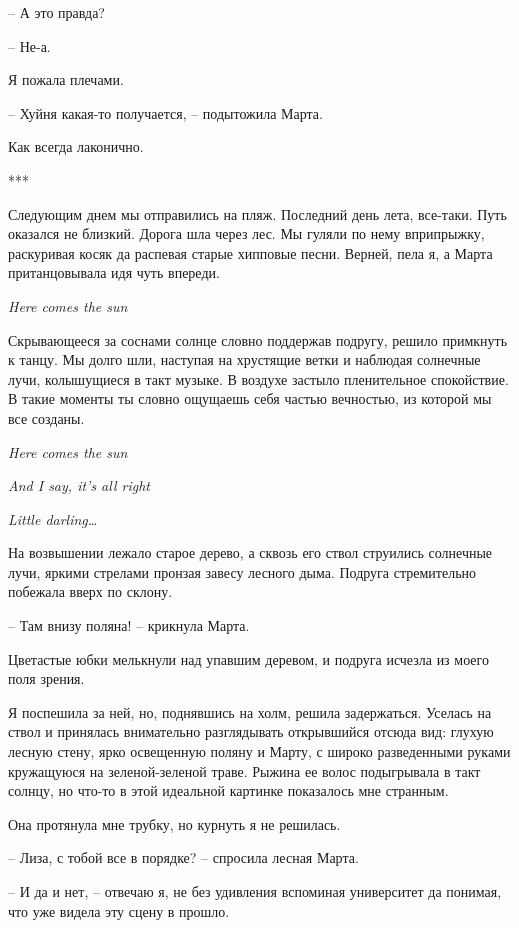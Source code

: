 \documentclass[
]{book}
\begin{document}
-- А это правда?

-- Не-а.

Я пожала плечами.

-- Хуйня какая-то получается, -- подытожила Марта.

Как всегда лаконично.

***

Следующим днем мы отправились на пляж. Последний день лета, все-таки. Путь оказался не близкий. Дорога шла через лес. Мы гуляли по нему вприпрыжку, раскуривая косяк да распевая старые хипповые песни. Верней, пела я, а Марта пританцовывала идя чуть впереди.

\emph{Here comes the sun}

Скрывающееся за соснами солнце словно поддержав подругу, решило примкнуть к танцу. Мы долго шли, наступая на хрустящие ветки и наблюдая солнечные лучи, колышущиеся в такт музыке. В воздухе застыло пленительное спокойствие. В такие моменты ты словно ощущаешь себя частью вечностью, из которой мы все созданы.

\emph{Here comes the sun}

\emph{And I say, it's all right}

\emph{Little darling\ldots{}}

На возвышении лежало старое дерево, а сквозь его ствол струились солнечные лучи, яркими стрелами пронзая завесу лесного дыма. Подруга стремительно побежала вверх по склону.

-- Там внизу поляна! -- крикнула Марта.

Цветастые юбки мелькнули над упавшим деревом, и подруга исчезла из моего поля зрения.

Я поспешила за ней, но, поднявшись на холм, решила задержаться. Уселась на ствол и принялась внимательно разглядывать открывшийся отсюда вид: глухую лесную стену, ярко освещенную поляну и Марту, с широко разведенными руками кружащуюся на зеленой-зеленой траве. Рыжина ее волос подыгрывала в такт солнцу, но что-то в этой идеальной картинке показалось мне странным.

Она протянула мне трубку, но курнуть я не решилась.

-- Лиза, с тобой все в порядке? -- спросила лесная Марта.

-- И да и нет, -- отвечаю я, не без удивления вспоминая университет да понимая, что уже видела эту сцену в прошло.

\hypertarget{chapter-102}{%
\chapter{~}\label{chapter-102}}
\end{document}
